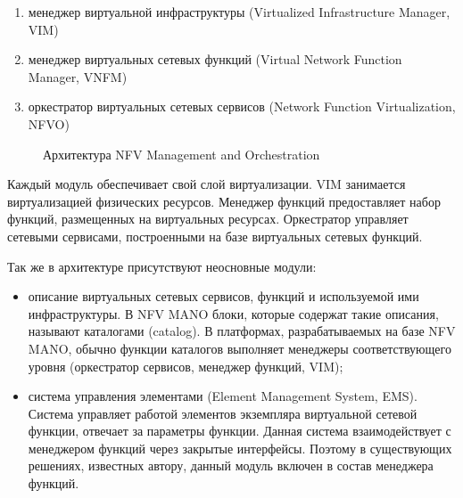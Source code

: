 \documentclass[oneside,final,14pt,a4paper]{extreport}
\begin{document}
\begin{enumerate}
	\item менеджер виртуальной инфраструктуры (Virtualized Infrastructure Manager, VIM)
	\item менеджер виртуальных сетевых функций (Virtual Network Function Manager, VNFM)
	\item оркестратор виртуальных сетевых сервисов (Network Function Virtualization, NFVO)
\end{enumerate}

\begin{figure}[h]
\caption{Архитектура NFV Management and Orchestration}
\label{nfv-mano-image1}
\end{figure}

Каждый модуль обеспечивает свой слой виртуализации. VIM занимается виртуализацией физических ресурсов. Менеджер функций предоставляет набор функций, размещенных на виртуальных ресурсах. Оркестратор управляет сетевыми сервисами, построенными на базе виртуальных сетевых функций.

Так же в архитектуре присутствуют неосновные модули:
\begin{itemize}
	\item описание виртуальных сетевых сервисов, функций и используемой ими инфраструктуры. В NFV MANO блоки, которые содержат такие описания, называют каталогами (catalog). В платформах, разрабатываемых на базе NFV MANO, обычно функции каталогов выполняет менеджеры соответствующего уровня (оркестратор сервисов, менеджер функций, VIM);
	\item система управления элементами (Element Management System, EMS). Система управляет работой элементов экземпляра виртуальной сетевой функции, отвечает за параметры функции. Данная система взаимодействует с менеджером функций через закрытые интерфейсы. Поэтому в существующих решениях, известных автору, данный модуль включен в состав менеджера функций.
\end{itemize}
\end{document}
